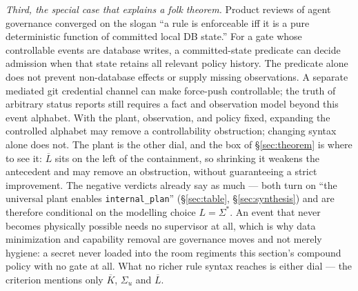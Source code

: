 \documentclass[11pt,a4paper]{article}  \usepackage{mdframed} \usepackage{graphicx} \usepackage{tabularx}
\begin{document}
\emph{Third, the special case that explains a folk theorem.} Product reviews of agent governance converged on the slogan ``a
rule is enforceable iff it is a pure deterministic function of committed local DB state.'' For a gate whose controllable events are database writes, a committed-state predicate can decide admission when that state retains all relevant policy history. The predicate alone does not prevent non-database effects or supply missing observations. A separate mediated git credential channel can make force-push controllable; the truth of arbitrary status reports still requires a fact and observation model beyond this event alphabet. With the plant, observation, and policy fixed, expanding the controlled
alphabet may remove a controllability obstruction; changing syntax alone does not. The plant is the other dial, and the box of
\S\ref{sec:theorem} is where to see it: $\overline{L}$ sits on the left of the containment, so shrinking it weakens the
antecedent and may remove an obstruction, without guaranteeing a strict improvement. The negative verdicts already say as much --- both turn on ``the universal
plant enables \texttt{internal\_\allowbreak plan}'' (\S\ref{sec:table}, \S\ref{sec:synthesis}) and are therefore conditional on the
modelling choice $L=\Sigma^*$. An event that never becomes physically possible needs no supervisor at all, which is why data
minimization and capability removal are governance moves and not merely hygiene: a secret never loaded into the room
regiments this section's compound policy with no gate at all. What no richer rule syntax reaches is either dial --- the
criterion mentions only $\overline{K}$, $\Sigma_u$ and $\overline{L}$.
\end{document}
